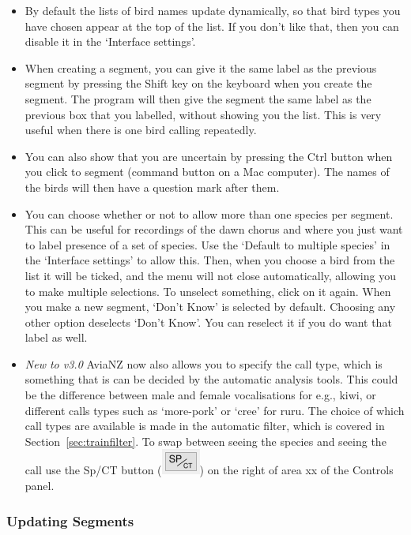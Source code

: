\documentclass{article}
\begin{document}
\begin{itemize}
\item By default the lists of bird names update dynamically, so that bird types you have chosen appear at the top of the list. If you don't like that, then you can disable it in the `Interface settings'. 

\item When creating a segment, you can give it the same label as the previous segment by pressing the Shift key on the keyboard when you create the segment. The program will then give the segment the same label as the previous box that you labelled, without showing you the list. This is very useful when there is one bird calling repeatedly.

\item You can also show that you are uncertain by pressing the Ctrl button when you click to segment (command button on a Mac computer). The names of the birds will then have a question mark after them.

\item You can choose whether or not to allow more than one species per segment. This can be useful for recordings of the dawn chorus and where you just want to label presence of a set of species. Use the `Default to multiple species' in the `Interface settings' to allow this. Then, when you choose a bird from the list it will be ticked, and the menu will not close automatically, allowing you to make multiple selections. To unselect something, click on it again. When you make a new segment, `Don't Know' is selected by default. Choosing any other option deselects `Don't Know'. You can reselect it if you do want that label as well. 

\item {\em New to v3.0} AviaNZ now also allows you to specify the call type, which is something that is can be decided by the automatic analysis tools. This could be the difference between male and female vocalisations for e.g., kiwi, or different calls types such as `more-pork' or `cree' for ruru. The choice of which call types are available is made in the automatic filter, which is covered in Section~\ref{sec:trainfilter}. To swap between seeing the species and seeing the call use the Sp/CT button (\includegraphics[scale=0.5]{Figures/SPCT}) on the right of area xx of the Controls panel.
\end{itemize}

\subsubsection*{Updating Segments}
\end{document}
